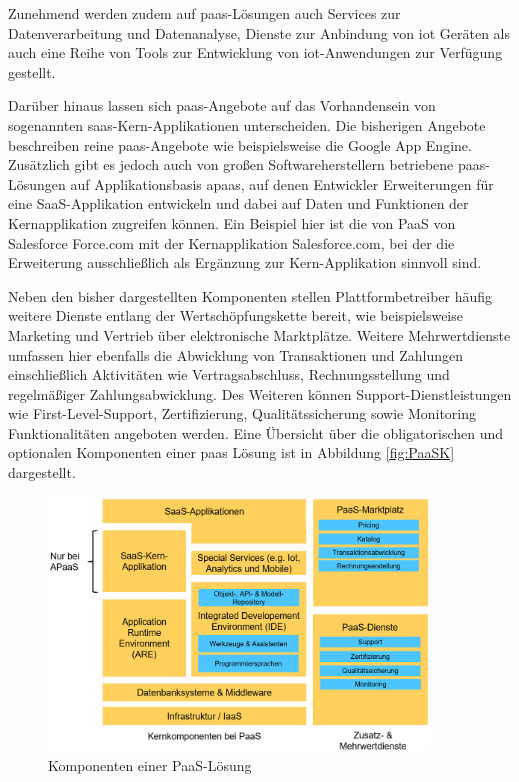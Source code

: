 Zunehmend werden zudem auf \ac{paas}-Lösungen auch Services zur Datenverarbeitung und Datenanalyse, Dienste zur Anbindung von \ac{iot} Geräten als auch eine Reihe von Tools zur Entwicklung von \ac{iot}-Anwendungen zur Verfügung gestellt. \autocite[Vgl.][]{IBM2023}

Darüber hinaus lassen sich \ac{paas}-Angebote auf das Vorhandensein von sogenannten \ac{saas}-Kern-Applikationen unterscheiden. Die bisherigen Angebote beschreiben reine \ac{paas}-Angebote wie beispielsweise die Google App Engine. Zusätzlich gibt es jedoch auch von großen Softwareherstellern betriebene \ac{paas}-Lösungen auf Applikationsbasis \acs{apaas}, auf denen Entwickler Erweiterungen für eine SaaS-Applikation entwickeln und dabei auf Daten und Funktionen der Kernapplikation zugreifen können. Ein Beispiel hier ist die von PaaS von Salesforce Force.com mit der Kernapplikation Salesforce.com, bei der die Erweiterung ausschließlich als Ergänzung zur Kern-Applikation sinnvoll sind. \autocite[Vgl.][S. 371]{BEIMBORN2011} 

Neben den bisher dargestellten Komponenten stellen Plattformbetreiber häufig weitere Dienste entlang der Wertschöpfungskette bereit, wie beispielsweise Marketing und Vertrieb über elektronische Marktplätze. Weitere Mehrwertdienste umfassen hier ebenfalls die Abwicklung von Transaktionen und Zahlungen einschließlich Aktivitäten wie Vertragsabschluss, Rechnungsstellung und regelmäßiger Zahlungsabwicklung. Des Weiteren können Support-Dienstleistungen wie First-Level-Support, Zertifizierung, Qualitätssicherung sowie Monitoring Funktionalitäten angeboten werden. \autocite[Vgl.][S. 598]{HAHN2016} Eine Übersicht über die obligatorischen und optionalen Komponenten einer \ac{paas} Lösung ist in Abbildung \vref{fig:PaaSK} dargestellt.


\begin{figure}[h]
    \centering
    \includegraphics[width=0.9\textwidth]{img/PaaS_Komponenten.jpg}
    \caption[Komponenten einer PaaS-Lösung]{Komponenten einer PaaS-Lösung\autocite{PaaSK}}
    \label{fig:PaaSK}
\end{figure}

